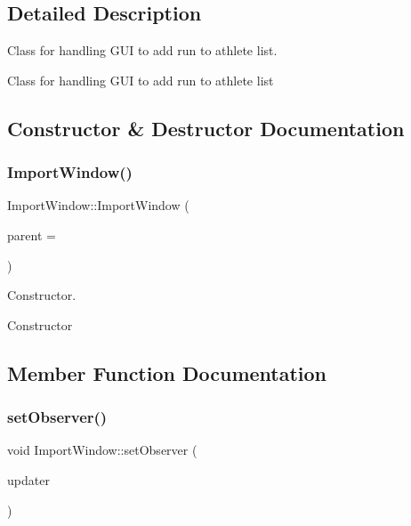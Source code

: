 \subsection{Detailed Description}
Class for handling G\+UI to add run to athlete list. 

Class for handling G\+UI to add run to athlete list 

\subsection{Constructor \& Destructor Documentation}
\mbox{\label{classImportWindow_afe9636b4ecf8c7c7b01439cbd77242be}} 
\subsubsection{\texorpdfstring{ImportWindow()}{ImportWindow()}}
{\footnotesize\ttfamily Import\+Window\+::\+Import\+Window (\begin{DoxyParamCaption}\item[{Q\+Widget $\ast$}]{parent = {} }\end{DoxyParamCaption})\hspace{0.3cm}{\ttfamily [explicit]}}



Constructor. 

Constructor 

\subsection{Member Function Documentation}
\mbox{\label{classImportWindow_a33b83ce4d2baa190574995f4ab88c31b}} 
\subsubsection{\texorpdfstring{setObserver()}{setObserver()}}
{\footnotesize\ttfamily void Import\+Window\+::set\+Observer (\begin{DoxyParamCaption}\item[{\mbox{\hyperlink{classFileUpdater}{File\+Updater}} $\ast$}]{updater }\end{DoxyParamCaption})}



